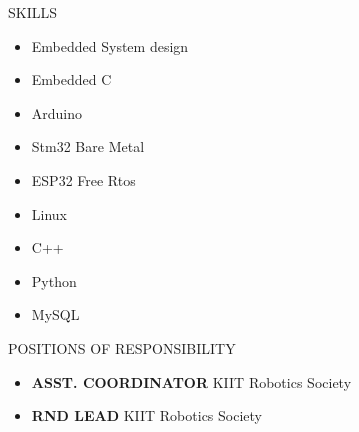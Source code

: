 \documentclass{resume} %
\newcommand{\ExternalLink}{%
    \tikz[x=1.2ex, y=1.2ex, baseline=-0.05ex]{%
        \begin{scope}[x=1ex, y=1ex]
            \clip (-0.1,-0.1) 
                --++ (-0, 1.2) 
                --++ (0.6, 0) 
                --++ (0, -0.6) 
                --++ (0.6, 0) 
                --++ (0, -1);
            \path[draw, 
                line width = 0.5, 
                rounded corners=0.5] 
                (0,0) rectangle (1,1);
        \end{scope}
        \path[draw, line width = 0.5] (0.5, 0.5) 
            -- (1, 1);
        \path[draw, line width = 0.5] (0.6, 1) 
            -- (1, 1) -- (1, 0.6);
        }
    }
\begin{document}
\begin{rSection}{SKILLS}
    \begin{multicols}{3}
    \begin{itemize}
        \item Embedded System design        
        \item Embedded C
        \item Arduino                                       
        \item Stm32 Bare Metal
        \item ESP32 Free Rtos 
        \item Linux
        \item C++
        \item Python
        \item MySQL
    \end{itemize}
    \end{multicols}
\end{rSection}
\begin{rSection}{POSITIONS OF RESPONSIBILITY}
\begin{itemize}
    \item	\textbf{ASST. COORDINATOR} {KIIT Robotics Society}
    \item	\textbf{RND LEAD} {KIIT Robotics Society}
\end{itemize}
\end{rSection}

\end{document}
